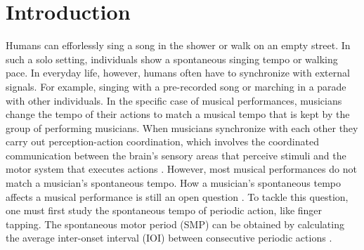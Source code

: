\documentclass{report}
\begin{document}
\section{Introduction}
Humans can efforlessly sing a song in the shower or walk on an empty street. In such a solo setting, individuals show a spontaneous singing tempo or walking pace. In everyday life, however, humans often have to synchronize with external signals. For example, singing with a pre-recorded song or marching in a parade with other individuals. In the specific case of musical performances, musicians change the tempo of their actions to match a musical tempo that is kept by the group of performing musicians. When musicians synchronize with each other they carry out perception-action coordination, which involves the coordinated communication between the brain's sensory areas that perceive stimuli and the motor system that executes actions \cite{ridderinkhof2014neurocognitive}. However, most musical performances do not match a musician's spontaneous tempo. How a musician's spontaneous tempo affects a musical performance is still an open question \cite{zamm2018musicians}. To tackle this question, one must first study the spontaneous tempo of periodic action, like finger tapping. The spontaneous motor period (SMP) can be obtained by calculating the average inter-onset interval (IOI) between consecutive periodic actions \cite{mcauley2006time}.
\end{document}
